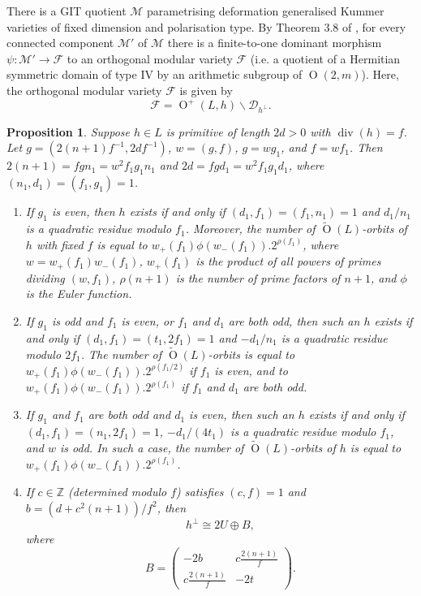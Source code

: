 \documentclass[11pt]{amsart}
\newtheorem{prop}[thm]{Proposition}
\newcommand{\ZZ}{\mathbb{Z}}
\newcommand{\dc}{\mathcal{D}}
\newcommand{\mc}{\mathcal{M}}
\newcommand{\opn}{\operatorname}
\newcommand{\fc}{\mathcal{F}}
\begin{document}
There is a GIT quotient $\mc$ parametrising deformation generalised Kummer varieties of fixed dimension and polarisation type.
By Theorem 3.8 of \cite{Handbook}, for every connected component $\mc'$ of $\mc$ there is a finite-to-one dominant morphism $\psi: \mc' \rightarrow \fc$ to an orthogonal modular variety $\fc$ (i.e. a quotient of a Hermitian symmetric domain of type IV by an arithmetic subgroup of $\opn{O}(2,m)$).
Here, the orthogonal modular variety $\fc$ is given by 
\begin{equation*}
\fc= \opn{O}^+(L, h) \backslash \dc_{h^{\perp}}.
\end{equation*}
\begin{prop}\label{orbitclass}
Suppose $h \in L$ is primitive of length $2d >0$ with $\opn{div}(h) = f$.
Let $g = \left (2(n+1)f^{-1}, 2df^{-1} \right )$, 
$w=(g,f)$, 
$g = w g_1$, 
and $f = wf_1$. 
Then 
$2(n+1) = fgn_1 = w^2 f_1 g_1 n_1$ 
and 
$2d=f g d_1 = w^2 f_1 g_1 d_1$, 
where 
$(n_1, d_1) = (f_1, g_1) = 1$.
\begin{enumerate}
\item If $g_1$ is even, then $h$ exists if and only if $(d_1, f_1) = (f_1, n_1) = 1$ and $d_1/n_1$ is a quadratic residue modulo $f_1$. 
Moreover, the number of $\widetilde{\opn{O}}(L)$-orbits of $h$ with fixed $f$ is equal to $w_+(f_1) \phi(w_-(f_1)).2^{\rho(f_1)}$, where $w=w_+(f_1) w_-(f_1)$, $w_+(f_1)$ is the product of all powers of primes dividing $(w, f_1)$, $\rho(n+1)$ is the number of prime factors of $n+1$, and $\phi$ is the Euler function.
\item If $g_1$ is odd and $f_1$ is even, or $f_1$ and $d_1$ are both odd, then such an $h$ exists if and only if $(d_1, f_1) = (t_1, 2f_1)=1$ and $-d_1 / n_1$ is a quadratic residue modulo $2f_1$. 
The number of $\widetilde{\opn{O}}(L)$-orbits is equal to $w_+(f_1) \phi(w_-(f_1)).2^{\rho(f_1/2)}$ if $f_1$ is even, and to $w_+(f_1) \phi(w_-(f_1)).2^{\rho(f_1)}$ if $f_1$ and $d_1$ are both odd.
\item If $g_1$ and $f_1$ are both odd and $d_1$ is even, then such an $h$ exists if and only if $(d_1, f_1) = (n_1, 2f_1)=1$, $-d_1/(4t_1)$ is a quadratic residue modulo $f_1$, and $w$ is odd.
In such a case, the number of $\widetilde{\opn{O}}(L)$-orbits of $h$ is equal to $w_+(f_1) \phi(w_-(f_1)).2^{\rho(f_1)}$.
\item If $c \in \ZZ$ (determined modulo $f$) satisfies $(c, f)=1$ and $b = (d+c^2(n+1))/f^2$, then
\begin{equation*}
h^{\perp} \cong 2U \oplus B,
\end{equation*}
where 
\begin{equation*}
B = \begin{pmatrix} -2b & c \frac{2(n+1)}{f} \\ c \frac{2(n+1)}{f} & -2t \end{pmatrix}.
\end{equation*} 
\end{enumerate}
\end{prop}
\end{document}
